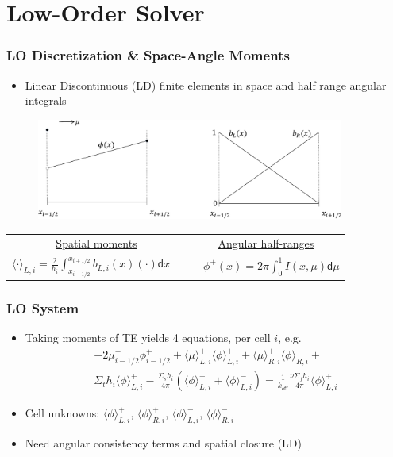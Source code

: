 \documentclass[xcolor=dvipsnames,handout]{beamer}
\newcommand{\keff}[0]{\ensuremath{{k}_{\textsf{eff}}} }
\newcommand{\colb}[1]{{\color{blue} #1}}
\newlength{\wideitemsep}
\let\olditem\item
\renewcommand{\item}{\setlength{\itemsep}{\wideitemsep}\olditem}
\renewcommand{\d}{\mathsf{d}}
\newcommand{\mom}[1]{\langle #1 \rangle}
\newcommand{\il}{{i-1/2}}
\newcommand{\ir}{{i+1/2}}
\begin{document}
\section{Low-Order Solver}

\begin{frame}
    \frametitle{LO Discretization \& Space-Angle Moments}
    \begin{itemize}
        \item Linear Discontinuous (LD) finite elements in space and half range
            angular integrals
    \end{itemize}
    \begin{figure}
    \begin{centering}
        \includegraphics[width=0.9\textwidth]{LD.pdf}
    \end{centering}
    \end{figure}
    \begin{center}
    \begin{tabular}{cc}
        \underline{Spatial moments} & \underline{Angular half-ranges} \\ 
        $ {\displaystyle \mom{\cdot}_{L,i} = \frac{2}{h_i} \int_{x_\il}^{x_\ir}
        b_{L,i}(x)(\cdot) \d x \quad }$  & ${ \quad \displaystyle \phi^+(x) = 2\pi\int_0^1 I(x,\mu) \d \mu}$
    \end{tabular}
    \end{center}

\end{frame}




\begin{frame}
    \frametitle{LO System}
    \begin{itemize}
        \item Taking moments of TE yields \colb{4 equations}, per cell $i$, e.g.
        {\small
        \begin{multline*}\label{lo_tran}
    -2{\mu}_{i-1/2}^{+} \phi_{i-1/2}^{+} + \mom {\mu}_{L,i}^{+}
  \mom{\phi}_{L,i}^{+}
  +  \mom\mu_{R,i}^{+}
  \mom{\phi}_{R,i}^{+} + \\ \Sigma_t h_i \mom{\phi}_{L,i}^+ -  \frac{\Sigma_s h_i}{4\pi} \left( \mom{\phi}_{L,i}^{+} +
  \mom\phi_{L,i}^{-}\right) = \frac{1}{\keff} \frac{\nu \Sigma_fh_i}{4\pi}\mom{\phi}_{L,i}^{+}
\end{multline*}}
        \item Cell unknowns: $\mom{\phi}_{L,i}^{+}$, $\mom{\phi}_{R,i}^{+}$,
        $\mom{\phi}_{L,i}^{-}$, $\mom{\phi}_{R,i}^{-}$ 

    \item Need \colb{angular} consistency terms  and spatial closure
        (LD)
    \end{itemize}

\end{frame}
\end{document}
